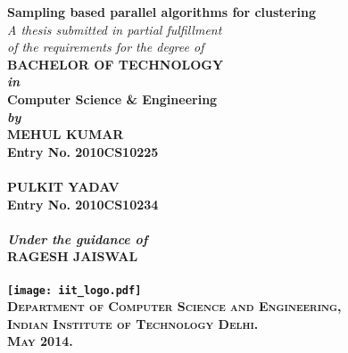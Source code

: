 \begin{titlepage}
\begin{center}

\LARGE{\textsf{\bfseries Sampling based parallel algorithms for clustering}}\\
\vspace{20pt}
\normalsize
\emph{A thesis submitted in partial fulfillment} \\
\emph{of the requirements for the degree of} \\
\vspace{20pt}
\bfseries BACHELOR OF TECHNOLOGY \\
\vspace{20pt}
\emph {in}\\
\vspace{20pt}
\bfseries Computer Science \& Engineering \\
\vspace{20pt}
\emph {by}\\
\vspace{20pt}
\Large{\textsf{\bfseries MEHUL KUMAR}} \\
{\normalsize \textsf{\bfseries Entry No. 2010CS10225}}\\
\ \\
\Large{\textsf{\bfseries PULKIT YADAV}} \\
{\normalsize \textsf{\bfseries Entry No. 2010CS10234}}\\
\ \\
{\normalsize \emph {Under the guidance of}}
\ \\
\Large{\textsf{\bfseries RAGESH JAISWAL}} \\
\ \\
\vspace{30pt}
\texttt{[image: iit\_logo.pdf]} \\
\vspace{10pt}
\large{\textsc{Department of Computer Science and Engineering,\\
Indian Institute of Technology Delhi.\\ May 2014.}}
\end{center}
\end{titlepage}
